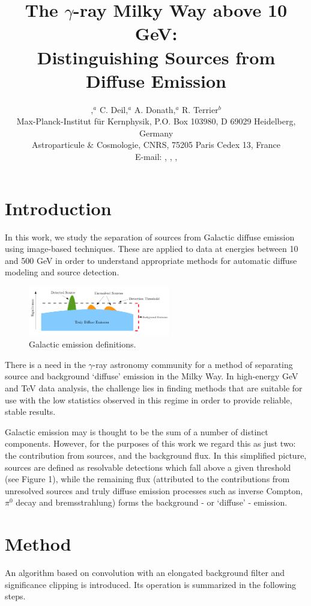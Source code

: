 \documentclass{PoS}
\title{The $\gamma$-ray Milky Way above 10 GeV:\\
Distinguishing Sources from Diffuse Emission}
\author{\speaker{E. Owen},$^a$ C. Deil,$^{a}$ A. Donath,$^{a}$ R. Terrier$^{b}$\\
\llap{$^a$}Max-Planck-Institut f\"{u}r Kernphysik, P.O. Box 103980, D
69029 Heidelberg, Germany\\
\llap{$^b$}Astroparticule \& Cosmologie, CNRS, 75205 Paris Cedex 13, France\\
E-mail: \email{ellis.owen@mpi-hd.mpg.de}, \email{christoph.deil@mpi-hd.mpg.de}, \email{axel.donath@mpi-hd.mpg.de}, \email{terrier@apc.univ-paris7.fr}}
\begin{document}
\section{Introduction}

In this work, we study the separation of sources from Galactic diffuse emission using image-based techniques. These are applied to data at energies between 10 and 500 GeV in order to understand appropriate methods for automatic diffuse modeling and source detection.

\begin{figure}
\vspace{-10pt}
  \centering
      \includegraphics[width=0.55\textwidth]{figures/definitions.png}
  \caption{Galactic emission definitions.}
\vspace{-15pt}
\end{figure}

There is a need in the $\gamma$-ray astronomy community for a method of separating source and background `diffuse' emission in the Milky Way. In high-energy GeV and TeV data analysis, the challenge lies in finding methods that are suitable for use with the low statistics observed in this regime in order to provide reliable, stable results.

Galactic emission may is thought to be the sum of a number of distinct components. However, for the purposes of this work we regard this as just two: the contribution from sources, and the background flux. In this simplified picture, sources are defined as resolvable detections which fall above a given threshold (see Figure 1), while the remaining flux (attributed to the contributions from unresolved sources and truly diffuse emission processes such as inverse Compton, $\pi^0$ decay and bremsstrahlung) forms the background - or `diffuse' - emission.

\section{Method}

An algorithm based on convolution with an elongated background filter and significance clipping is introduced. Its operation is summarized in the following steps.
\end{document}
